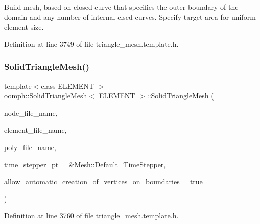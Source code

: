Build mesh, based on closed curve that specifies the outer boundary of the domain and any number of internal clsed curves. Specify target area for uniform element size. 



Definition at line 3749 of file triangle\+\_\+mesh.\+template.\+h.

\mbox{\label{classoomph_1_1SolidTriangleMesh_a15a943bd43fece042e2ffdefc8ceb0f4}} 
\subsubsection{\texorpdfstring{Solid\+Triangle\+Mesh()}{SolidTriangleMesh()}\hspace{0.1cm}{\footnotesize\ttfamily [2/2]}}
{\footnotesize\ttfamily template$<$class E\+L\+E\+M\+E\+NT $>$ \\
\hyperlink{classoomph_1_1SolidTriangleMesh}{oomph\+::\+Solid\+Triangle\+Mesh}$<$ E\+L\+E\+M\+E\+NT $>$\+::\hyperlink{classoomph_1_1SolidTriangleMesh}{Solid\+Triangle\+Mesh} (\begin{DoxyParamCaption}\item[{const std\+::string \&}]{node\+\_\+file\+\_\+name,  }\item[{const std\+::string \&}]{element\+\_\+file\+\_\+name,  }\item[{const std\+::string \&}]{poly\+\_\+file\+\_\+name,  }\item[{Time\+Stepper $\ast$}]{time\+\_\+stepper\+\_\+pt = {\ttfamily \&Mesh\+:\+:Default\+\_\+TimeStepper},  }\item[{const bool \&}]{allow\+\_\+automatic\+\_\+creation\+\_\+of\+\_\+vertices\+\_\+on\+\_\+boundaries = {\ttfamily true} }\end{DoxyParamCaption})\hspace{0.3cm}{\ttfamily [inline]}}



Definition at line 3760 of file triangle\+\_\+mesh.\+template.\+h.

\mbox{\label{classoomph_1_1SolidTriangleMesh_a5ab5a2ac3aee1a80fbb72b27fc929783}} 
